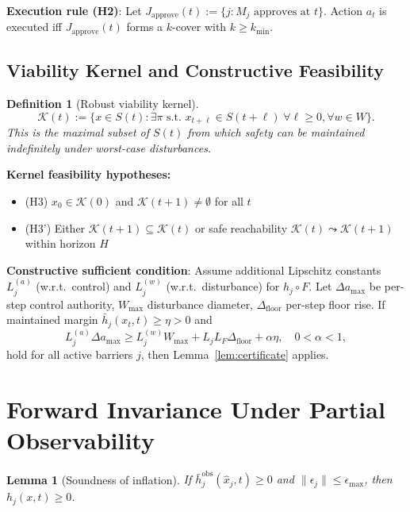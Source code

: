 \documentclass[11pt,a4paper]{article}
\newtheorem{lemma}{Lemma}
\newtheorem{definition}{Definition}
\begin{document}
\textbf{Execution rule (H2)}: Let $J_{\text{approve}}(t) := \{j: M_j \text{ approves at } t\}$. Action $a_t$ is executed iff $J_{\text{approve}}(t)$ forms a $k$-cover with $k \geq k_{\min}$.

\subsection{Viability Kernel and Constructive Feasibility}

\begin{definition}[Robust viability kernel]
\label{def:kernel}
$$\mathcal{K}(t) := \{x \in S(t): \exists \pi \text{ s.t. } x_{t+\ell} \in S(t+\ell) \;\forall \ell \geq 0, \forall w \in W\}.$$
This is the maximal subset of $S(t)$ from which safety can be maintained indefinitely under worst-case disturbances.
\end{definition}

\textbf{Kernel feasibility hypotheses:}
\begin{itemize}
\item (H3) $x_0 \in \mathcal{K}(0)$ and $\mathcal{K}(t+1) \neq \emptyset$ for all $t$
\item (H3') Either $\mathcal{K}(t+1) \subseteq \mathcal{K}(t)$ or safe reachability $\mathcal{K}(t) \leadsto \mathcal{K}(t+1)$ within horizon $H$
\end{itemize}

\textbf{Constructive sufficient condition}: Assume additional Lipschitz constants $L_j^{(a)}$ (w.r.t.~control) and $L_j^{(w)}$ (w.r.t.~disturbance) for $h_j \circ F$. Let $\Delta a_{\max}$ be per-step control authority, $W_{\max}$ disturbance diameter, $\Delta_{\text{floor}}$ per-step floor rise. If maintained margin $\bar{h}_j(x_t,t) \geq \eta > 0$ and
\begin{equation}
\label{eq:feasibility}
L_j^{(a)} \Delta a_{\max} \geq L_j^{(w)} W_{\max} + L_j L_F \Delta_{\text{floor}} + \alpha \eta, \quad 0 < \alpha < 1,
\end{equation}
hold for all active barriers $j$, then Lemma~\ref{lem:certificate} applies.

\section{Forward Invariance Under Partial Observability}

\begin{lemma}[Soundness of inflation]
\label{lem:soundness}
If $\bar{h}_j^{\text{obs}}(\hat{x}_j, t) \geq 0$ and $\|\epsilon_j\| \leq \epsilon_{\max}$, then $h_j(x,t) \geq 0$.
\end{lemma}
\end{document}
